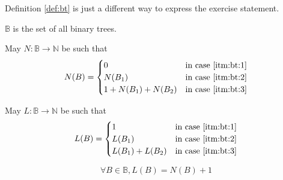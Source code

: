 \documentclass[docid=TP01]{tcom_TP}
\begin{document}
\begin{remark}
	Definition \ref{def:bt} is just a different way to express the exercise statement.
\end{remark}
\begin{definition}
	$\mathbb{B}$ is the set of all binary trees.
\end{definition}
\begin{definition}
	May $N\colon\mathbb{B}\rightarrow\mathbb{N}$ be such that
	\begin{alignat*}{2}
		N(B)= \begin{cases}
			  0               & \text{in case \ref{itm:bt:1}}\\
			  N(B_1)          & \text{in case \ref{itm:bt:2}}\\
			  1+N(B_1)+N(B_2) & \text{in case \ref{itm:bt:3}}\\
			  \end{cases}
	\end{alignat*}
\end{definition}
\begin{definition}
	May $L\colon\mathbb{B}\rightarrow\mathbb{N}$ be such that
	\begin{alignat*}{2}
		L(B)= \begin{cases}
			  1             & \text{in case \ref{itm:bt:1}}\\
			  L(B_1)        & \text{in case \ref{itm:bt:2}}\\
			  L(B_1)+L(B_2) & \text{in case \ref{itm:bt:3}}\\
			  \end{cases}
	\end{alignat*}
\end{definition}
\begin{theorem}
	\begin{equation*}
		\forall B \in \mathbb{B},L(B)=N(B)+1
	\end{equation*}
\end{theorem}
\end{document}
